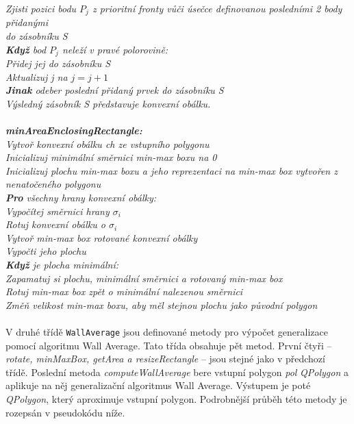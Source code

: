 \documentclass{article}
\begin{document}
\indent\indent\indent\textit{Zjisti pozici bodu $P_{j}$ z prioritní fronty vůči úsečce definovanou posledními 2 body přidanými}\\
\indent\indent\indent\textit{do zásobníku S}\\
\indent\indent\indent\textit{\textbf{Když} bod $P_{j}$ neleží v pravé polorovině:}\\
\indent\indent\indent\indent\textit{Přidej jej do zásobníku S}\\
\indent\indent\indent\indent\textit{Aktualizuj j na $j = j +1$}\\
\indent\indent\indent\textit{\textbf{Jinak} odeber poslední přidaný prvek do zásobníku S}\\
\indent\textit{Výsledný zásobník S představuje konvexní obálku.}\\
\vspace{0.2cm}\\
\indent\textit{\textbf{minAreaEnclosingRectangle:}}\\
\indent\textit{Vytvoř konvexní obálku ch ze vstupního polygonu}\\
\indent\textit{Inicializuj minimální směrnici min-max boxu na 0}\\
\indent\textit{Inicializuj plochu min-max boxu a jeho reprezentaci na min-max box vytvořen z nenatočeného polygonu}\\
\indent\textit{\textbf{Pro} všechny hrany konvexní obálky:}\\
\indent\indent\indent\textit{Vypočítej směrnici hrany $\sigma_{i}$}\\
\indent\indent\indent\textit{Rotuj konvexní obálku o $\sigma_{i}$}\\
\indent\indent\indent\textit{Vytvoř min-max box rotované konvexní obálky}\\
\indent\indent\indent\textit{Vypočti jeho plochu}\\
\indent\indent\indent\textit{\textbf{Když} je plocha minimální:}\\
\indent\indent\indent\indent\textit{Zapamatuj si plochu, minimální směrnici a rotovaný min-max box}\\
\indent\textit{Rotuj min-max box zpět o minimální nalezenou směrnici}\\
\indent\textit{Změň velikost min-max boxu, aby měl stejnou plochu jako původní polygon}\\
\vspace{0.2cm}\\
V druhé třídě \texttt{WallAverage} jsou definované metody pro výpočet generalizace pomocí algoritmu Wall Average. Tato třída obsahuje pět metod. První čtyři – \emph{rotate, minMaxBox, getArea a resizeRectangle} – jsou stejné jako v předchozí třídě. Poslední metoda \emph{computeWallAverage} bere vstupní polygon \emph{pol} \emph{QPolygon} a aplikuje na něj generalizační algoritmus Wall Average. Výstupem je poté \emph{QPolygon}, který aproximuje vstupní polygon. Podrobnější průběh této metody je rozepsán v pseudokódu níže.\\
\end{document}

